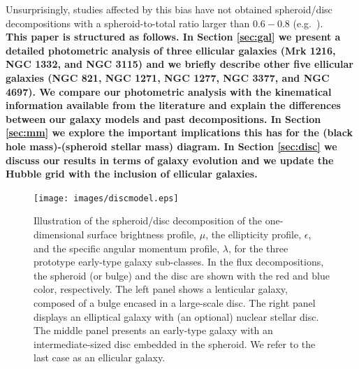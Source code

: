 \documentclass[useAMS,usenatbib,article]{mn2e}
\begin{document}
Unsurprisingly, studies affected by this bias have not obtained spheroid/disc decompositions with a spheroid-to-total ratio larger than $0.6 - 0.8$ 
(e.g.~\citealt{gadotti2008,head2014,querejeta2015,mendezabreu2015}). \\
{\bf This paper is structured as follows. 
In Section \ref{sec:gal} we present a detailed photometric analysis of three ellicular galaxies (Mrk 1216, NGC 1332, and NGC 3115) 
and we briefly describe other five ellicular galaxies (NGC 821, NGC 1271, NGC 1277, NGC 3377, and NGC 4697). 
We compare our photometric analysis with the kinematical information available from the literature 
and explain the differences between our galaxy models and past decompositions. 
In Section \ref{sec:mm} we explore the important implications this has for the (black hole mass)-(spheroid stellar mass) diagram. 
In Section \ref{sec:disc} we discuss our results in terms of galaxy evolution 
and we update the Hubble grid with the inclusion of ellicular galaxies. }


\begin{figure}
\begin{center}
\texttt{[image: images/discmodel.eps]}
\caption{Illustration of the spheroid/disc decomposition of the one-dimensional surface brightness profile, $\mu$, 
the ellipticity profile, $\epsilon$, and the specific angular momentum profile, $\lambda$,
for the three prototype early-type galaxy sub-classes. 
In the flux decompositions, the spheroid (or bulge) and the disc are shown with the red and blue color, respectively. 
The left panel shows a lenticular galaxy, composed of a bulge encased in a large-scale disc. 
The right panel displays an elliptical galaxy with (an optional) nuclear stellar disc. 
The middle panel presents an early-type galaxy with an intermediate-sized disc embedded in the spheroid. 
We refer to the last case as an ellicular galaxy.}
\label{fig:model}
\end{center}
\end{figure}
\end{document}
